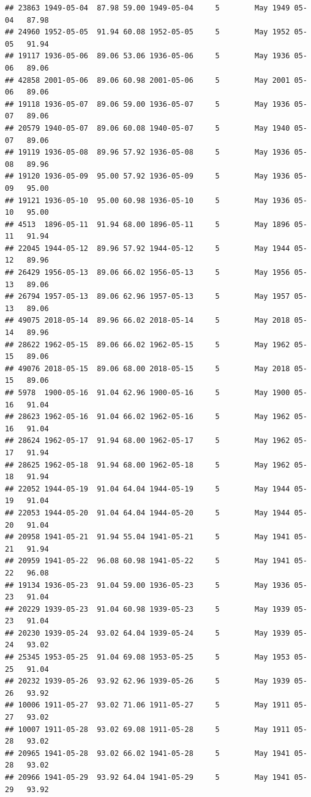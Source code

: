 \documentclass{article}\usepackage[]{graphicx}\usepackage[]{color}
\makeatletter
\newenvironment{kframe}{%
 \def\at@end@of@kframe{}%
 \ifinner\ifhmode%
  \def\at@end@of@kframe{\end{minipage}}%
  \begin{minipage}{\columnwidth}%
 \fi\fi%
 \def\FrameCommand##1{\hskip\@totalleftmargin \hskip-\fboxsep
 \colorbox{shadecolor}{##1}\hskip-\fboxsep
     \hskip-\linewidth \hskip-\@totalleftmargin \hskip\columnwidth}%
 \MakeFramed {\advance\hsize-\width
   \@totalleftmargin\z@ \linewidth\hsize
   \@setminipage}}%
 {\par\unskip\endMakeFramed%
 \at@end@of@kframe}
\newenvironment{knitrout}{}{} %
\makeatother
\begin{document}
\begin{knitrout}
\begin{kframe}
\begin{verbatim}
## 23863 1949-05-04  87.98 59.00 1949-05-04     5        May 1949 05-04   87.98
## 24960 1952-05-05  91.94 60.08 1952-05-05     5        May 1952 05-05   91.94
## 19117 1936-05-06  89.06 53.06 1936-05-06     5        May 1936 05-06   89.06
## 42858 2001-05-06  89.06 60.98 2001-05-06     5        May 2001 05-06   89.06
## 19118 1936-05-07  89.06 59.00 1936-05-07     5        May 1936 05-07   89.06
## 20579 1940-05-07  89.06 60.08 1940-05-07     5        May 1940 05-07   89.06
## 19119 1936-05-08  89.96 57.92 1936-05-08     5        May 1936 05-08   89.96
## 19120 1936-05-09  95.00 57.92 1936-05-09     5        May 1936 05-09   95.00
## 19121 1936-05-10  95.00 60.98 1936-05-10     5        May 1936 05-10   95.00
## 4513  1896-05-11  91.94 68.00 1896-05-11     5        May 1896 05-11   91.94
## 22045 1944-05-12  89.96 57.92 1944-05-12     5        May 1944 05-12   89.96
## 26429 1956-05-13  89.06 66.02 1956-05-13     5        May 1956 05-13   89.06
## 26794 1957-05-13  89.06 62.96 1957-05-13     5        May 1957 05-13   89.06
## 49075 2018-05-14  89.96 66.02 2018-05-14     5        May 2018 05-14   89.96
## 28622 1962-05-15  89.06 66.02 1962-05-15     5        May 1962 05-15   89.06
## 49076 2018-05-15  89.06 68.00 2018-05-15     5        May 2018 05-15   89.06
## 5978  1900-05-16  91.04 62.96 1900-05-16     5        May 1900 05-16   91.04
## 28623 1962-05-16  91.04 66.02 1962-05-16     5        May 1962 05-16   91.04
## 28624 1962-05-17  91.94 68.00 1962-05-17     5        May 1962 05-17   91.94
## 28625 1962-05-18  91.94 68.00 1962-05-18     5        May 1962 05-18   91.94
## 22052 1944-05-19  91.04 64.04 1944-05-19     5        May 1944 05-19   91.04
## 22053 1944-05-20  91.04 64.04 1944-05-20     5        May 1944 05-20   91.04
## 20958 1941-05-21  91.94 55.04 1941-05-21     5        May 1941 05-21   91.94
## 20959 1941-05-22  96.08 60.98 1941-05-22     5        May 1941 05-22   96.08
## 19134 1936-05-23  91.04 59.00 1936-05-23     5        May 1936 05-23   91.04
## 20229 1939-05-23  91.04 60.98 1939-05-23     5        May 1939 05-23   91.04
## 20230 1939-05-24  93.02 64.04 1939-05-24     5        May 1939 05-24   93.02
## 25345 1953-05-25  91.04 69.08 1953-05-25     5        May 1953 05-25   91.04
## 20232 1939-05-26  93.92 62.96 1939-05-26     5        May 1939 05-26   93.92
## 10006 1911-05-27  93.02 71.06 1911-05-27     5        May 1911 05-27   93.02
## 10007 1911-05-28  93.02 69.08 1911-05-28     5        May 1911 05-28   93.02
## 20965 1941-05-28  93.02 66.02 1941-05-28     5        May 1941 05-28   93.02
## 20966 1941-05-29  93.92 64.04 1941-05-29     5        May 1941 05-29   93.92

\end{verbatim}
\end{kframe}
\end{knitrout}
\end{document}
